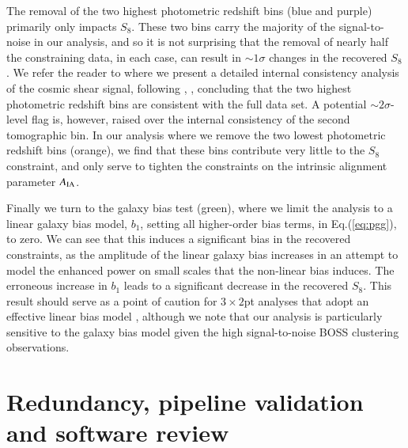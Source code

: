 \begin{appendix}
The removal of the two highest photometric redshift bins (blue and purple) primarily only impacts $S_8$.   These two bins carry the majority of the signal-to-noise in our analysis, and so it is not surprising that the removal of nearly half the constraining data, in each case, can result in $\sim 1 \sigma$ changes in the recovered $S_8$.   We refer the reader to \citet{asgari/etal:inprep} where we present a detailed internal consistency analysis of the cosmic shear signal, following \citet{kohlinger/etal:2019}, \citep[see also][]{efstathiou/lemos:2018},  concluding that the two highest photometric redshift bins are consistent with the full data set.   A potential $\sim 2\sigma$-level flag is, however, raised over the internal consistency of the second tomographic bin.  In our analysis where we remove the two lowest photometric redshift bins (orange), we find that these bins contribute very little to the $S_8$ constraint, and only serve to tighten the constraints on the intrinsic alignment parameter $A_{\rm IA}$.

Finally we turn to the galaxy bias test (green), where we limit the analysis to a linear galaxy bias model, $b_1$, setting all higher-order bias terms, in Eq.(\ref{eq:pgg}), to zero.   We can see that this induces a significant bias in the recovered constraints, as the amplitude of the linear galaxy bias increases in an attempt to model the enhanced power on small scales that the non-linear bias induces.   The erroneous increase in $b_1$ leads to a significant decrease in the recovered $S_8$.  This result should serve as a point of caution for $3\times2$pt analyses that adopt an effective linear bias model \citep[see also][]{asgari/etal:2020}, although we note that our analysis is particularly sensitive to the galaxy bias model given the high signal-to-noise BOSS clustering observations.


\section{Redundancy, pipeline validation and software review}
\label{app:codereview}


\end{appendix}
